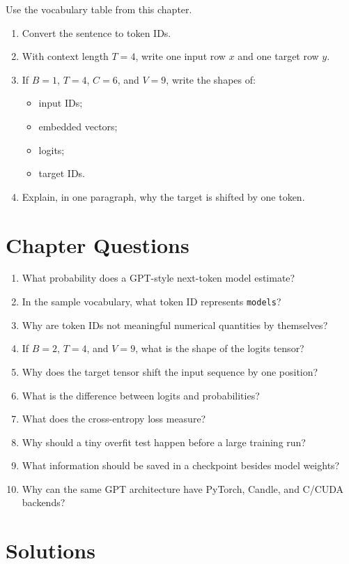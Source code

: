 Use the vocabulary table from this chapter.

\begin{enumerate}
  \item Convert the sentence to token IDs.
  \item With context length \(T=4\), write one input row \(x\) and one target row \(y\).
  \item If \(B=1\), \(T=4\), \(C=6\), and \(V=9\), write the shapes of:
    \begin{itemize}
      \item input IDs;
      \item embedded vectors;
      \item logits;
      \item target IDs.
    \end{itemize}
  \item Explain, in one paragraph, why the target is shifted by one token.
\end{enumerate}

\section{Chapter Questions}

\begin{enumerate}
  \item What probability does a GPT-style next-token model estimate?
  \item In the sample vocabulary, what token ID represents \texttt{models}?
  \item Why are token IDs not meaningful numerical quantities by themselves?
  \item If \(B=2\), \(T=4\), and \(V=9\), what is the shape of the logits tensor?
  \item Why does the target tensor shift the input sequence by one position?
  \item What is the difference between logits and probabilities?
  \item What does the cross-entropy loss measure?
  \item Why should a tiny overfit test happen before a large training run?
  \item What information should be saved in a checkpoint besides model weights?
  \item Why can the same GPT architecture have PyTorch, Candle, and C/CUDA backends?
\end{enumerate}

\section{Solutions}

